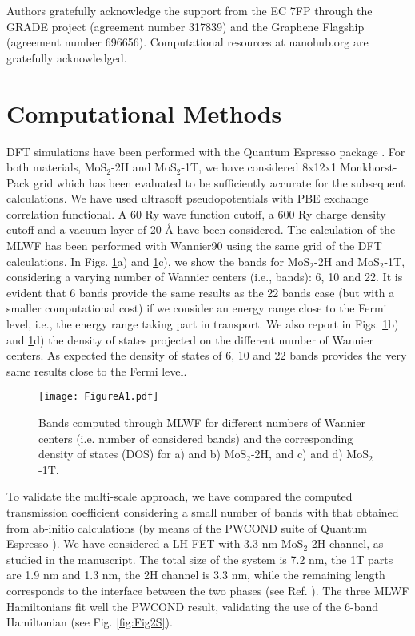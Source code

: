 \documentclass[aps,reprint,superscriptaddress,secnumarabic,amssymb,showpacs]{revtex4-1}
\begin{document}
\begin{acknowledgments}
Authors gratefully acknowledge the support from the EC 7FP through the GRADE project (agreement number 317839) and the Graphene Flagship (agreement number 696656). Computational resources at nanohub.org are gratefully acknowledged. 
\end{acknowledgments}


\appendix*
\section{Computational Methods}
\label{App}

DFT simulations have been performed with the Quantum Espresso package \cite{QE}. For both materials, MoS$_2$-2H and MoS$_2$-1T, we have considered 8x12x1 Monkhorst-Pack grid which has been evaluated to be sufficiently accurate for the subsequent calculations. We have used ultrasoft pseudopotentials with PBE exchange correlation functional. A 60 Ry wave function cutoff, a 600 Ry charge density cutoff and a vacuum layer of 20 \r{A} have been considered. The calculation of the MLWF has been performed with Wannier90 \cite{Wannier} using the same grid of the DFT calculations. In Figs. \ref{fig:Fig1S}a) and \ref{fig:Fig1S}c), we show the bands for MoS$_2$-2H and MoS$_2$-1T, considering a varying number of Wannier centers (i.e., bands): 6, 10 and 22. It is evident that 6 bands provide the same results as the 22 bands case (but with a smaller computational cost) if we consider an energy range close to the Fermi level, i.e., the energy range taking part in transport. We also report in Figs. \ref{fig:Fig1S}b) and \ref{fig:Fig1S}d) the density of states projected on the different number of Wannier centers. As expected the density of states of 6, 10 and 22 bands provides the very same results close to the Fermi level.

\begin{figure}[h!!!]
\texttt{[image: FigureA1.pdf]}
\caption{Bands computed through MLWF for different numbers of Wannier centers (i.e. number of considered bands) and the corresponding density of states (DOS) for a) and b) MoS$_2$-2H, and c) and d) MoS$_2$-1T.}
\label{fig:Fig1S}
\end{figure}

To validate the multi-scale approach, we have compared the computed transmission coefficient considering a small number of bands with that obtained from ab-initio calculations (by means of the PWCOND suite of Quantum Espresso \cite{QE}). We have considered a LH-FET with 3.3 nm MoS$_2$-2H channel, as studied in the manuscript. The total size of the system is 7.2 nm, the 1T parts are 1.9 nm and 1.3 nm, the 2H channel is 3.3 nm, while the remaining length corresponds to the interface between the two phases (see Ref. \cite{Cusati2016}). The three MLWF Hamiltonians fit well the PWCOND result, validating the use of the 6-band Hamiltonian (see Fig. \ref{fig:Fig2S}). 
\end{document}
